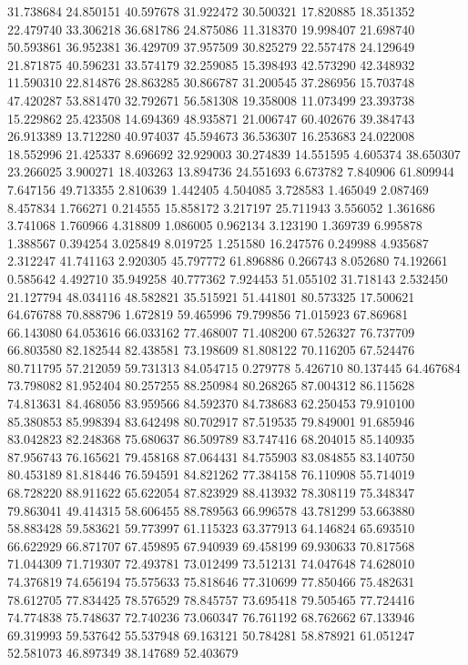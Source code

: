 31.738684
24.850151
40.597678
31.922472
30.500321
17.820885
18.351352
22.479740
33.306218
36.681786
24.875086
11.318370
19.998407
21.698740
50.593861
36.952381
36.429709
37.957509
30.825279
22.557478
24.129649
21.871875
40.596231
33.574179
32.259085
15.398493
42.573290
42.348932
11.590310
22.814876
28.863285
30.866787
31.200545
37.286956
15.703748
47.420287
53.881470
32.792671
56.581308
19.358008
11.073499
23.393738
15.229862
25.423508
14.694369
48.935871
21.006747
60.402676
39.384743
26.913389
13.712280
40.974037
45.594673
36.536307
16.253683
24.022008
18.552996
21.425337
8.696692
32.929003
30.274839
14.551595
4.605374
38.650307
23.266025
3.900271
18.403263
13.894736
24.551693
6.673782
7.840906
61.809944
7.647156
49.713355
2.810639
1.442405
4.504085
3.728583
1.465049
2.087469
8.457834
1.766271
0.214555
15.858172
3.217197
25.711943
3.556052
1.361686
3.741068
1.760966
4.318809
1.086005
0.962134
3.123190
1.369739
6.995878
1.388567
0.394254
3.025849
8.019725
1.251580
16.247576
0.249988
4.935687
2.312247
41.741163
2.920305
45.797772
61.896886
0.266743
8.052680
74.192661
0.585642
4.492710
35.949258
40.777362
7.924453
51.055102
31.718143
2.532450
21.127794
48.034116
48.582821
35.515921
51.441801
80.573325
17.500621
64.676788
70.888796
1.672819
59.465996
79.799856
71.015923
67.869681
66.143080
64.053616
66.033162
77.468007
71.408200
67.526327
76.737709
66.803580
82.182544
82.438581
73.198609
81.808122
70.116205
67.524476
80.711795
57.212059
59.731313
84.054715
0.279778
5.426710
80.137445
64.467684
73.798082
81.952404
80.257255
88.250984
80.268265
87.004312
86.115628
74.813631
84.468056
83.959566
84.592370
84.738683
62.250453
79.910100
85.380853
85.998394
83.642498
80.702917
87.519535
79.849001
91.685946
83.042823
82.248368
75.680637
86.509789
83.747416
68.204015
85.140935
87.956743
76.165621
79.458168
87.064431
84.755903
83.084855
83.140750
80.453189
81.818446
76.594591
84.821262
77.384158
76.110908
55.714019
68.728220
88.911622
65.622054
87.823929
88.413932
78.308119
75.348347
79.863041
49.414315
58.606455
88.789563
66.996578
43.781299
53.663880
58.883428
59.583621
59.773997
61.115323
63.377913
64.146824
65.693510
66.622929
66.871707
67.459895
67.940939
69.458199
69.930633
70.817568
71.044309
71.719307
72.493781
73.012499
73.512131
74.047648
74.628010
74.376819
74.656194
75.575633
75.818646
77.310699
77.850466
75.482631
78.612705
77.834425
78.576529
78.845757
73.695418
79.505465
77.724416
74.774838
75.748637
72.740236
73.060347
76.761192
68.762662
67.133946
69.319993
59.537642
55.537948
69.163121
50.784281
58.878921
61.051247
52.581073
46.897349
38.147689
52.403679
